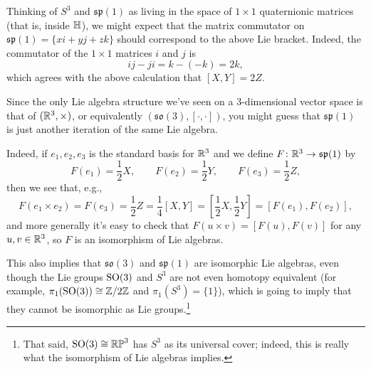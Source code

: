 Thinking of $S^3$ and $\mathfrak{sp}(1)$ as living in the space of $1 \times 1$ quaternionic matrices (that is, inside $\mathbb{H}$), we might expect that the matrix commutator on $\mathfrak{sp}(1) = \{xi + yj + zk\}$ should correspond to the above Lie bracket. Indeed, the commutator of the $1 \times 1$ matrices $i$ and $j$ is
\[
	ij - ji  = k - (-k) = 2k,
\]
which agrees with the above calculation that $[X,Y] = 2Z$.


Since the only Lie algebra structure we've seen on a 3-dimensional vector space is that of $(\mathbb{R}^3,\times)$, or equivalently $(\mathfrak{so}(3),[\cdot,\cdot])$, you might guess that $\mathfrak{sp}(1)$ is just another iteration of the same Lie algebra.

Indeed, if $e_1, e_2 , e_3$ is the standard basis for $\mathbb{R}^3$ and we define $F\colon\thinspace\! \mathbb{R}^3 \to \mathfrak{sp}(1)$ by
\[
	F(e_1) = \frac{1}{2} X, \qquad F(e_2) = \frac{1}{2} Y, \qquad F(e_3) = \frac{1}{2} Z,
\]
then we see that, e.g.,
\[
	 F(e_1 \times e_2) = F(e_3) =  \frac{1}{2}Z = \frac{1}{4}[X,Y] = \left[ \frac{1}{2}X, \frac{1}{2}Y\right] = [F(e_1),F(e_2)],
\] 
and more generally it's easy to check that $F(u\times v) = [F(u),F(v)]$ for any $u,v \in \mathbb{R}^3$, so $F$ is an isomorphism of Lie algebras. 

This also implies that $\mathfrak{so}(3)$ and $\mathfrak{sp}(1)$ are isomorphic Lie algebras, even though the Lie groups $\operatorname{SO}(3)$ and $S^3$ are not even homotopy equivalent (for example, $\pi_1(\operatorname{SO}(3))\cong \mathbb{Z}/2\mathbb{Z}$ and $\pi_1(S^3) = \{1\}$), which is going to imply that they cannot be isomorphic as Lie groups.\footnote{That said, $\operatorname{SO}(3) \cong \mathbb{RP}^3$ has $S^3$ as its universal cover; indeed, this is really what the isomorphism of Lie algebras implies.}